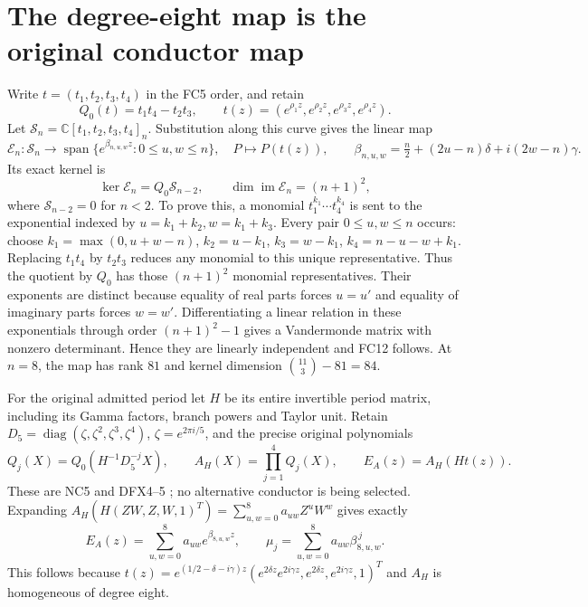 \documentclass[11pt]{article}
\newcommand{\C}{\mathbb C}
\newcommand{\diag}{\operatorname{diag}}
\begin{document}
\section{The degree-eight map is the original conductor map}
Write $t=(t_1,t_2,t_3,t_4)$ in the FC5 order, and retain
\[
 Q_0(t)=t_1t_4-t_2t_3,\qquad
 t(z)=(e^{\rho_1z},e^{\rho_2z},e^{\rho_3z},e^{\rho_4z}).
 \tag{FC10}
\]
Let $\mathcal S_n=\C[t_1,t_2,t_3,t_4]_n$. Substitution along this
curve gives the linear map
\[
 \mathcal E_n:\mathcal S_n\to
 \operatorname{span}\{e^{\beta_{n,u,w}z}:0\le u,w\le n\},
 \quad P\mapsto P(t(z)),\qquad
 \beta_{n,u,w}=\tfrac n2+(2u-n)\delta+i(2w-n)\gamma.
 \tag{FC11}
\]
Its exact kernel is
\[
 \ker\mathcal E_n=Q_0\mathcal S_{n-2},\qquad
 \dim\operatorname{im}\mathcal E_n=(n+1)^2,
 \tag{FC12}
\]
where $\mathcal S_{n-2}=0$ for $n<2$.
To prove this, a monomial $t_1^{k_1}\cdots t_4^{k_4}$ is sent to the
exponential indexed by $u=k_1+k_2,w=k_1+k_3$. Every pair $0\le u,w\le n$
occurs: choose
$k_1=\max(0,u+w-n)$, $k_2=u-k_1$, $k_3=w-k_1$,
$k_4=n-u-w+k_1$. Replacing $t_1t_4$ by $t_2t_3$ reduces any monomial to
this unique representative. Thus the quotient by $Q_0$ has those
$(n+1)^2$ monomial representatives. Their exponents are distinct because
equality of real parts forces $u=u'$ and equality of imaginary parts
forces $w=w'$. Differentiating a linear relation in these exponentials
through order $(n+1)^2-1$ gives a Vandermonde matrix with nonzero
determinant. Hence they are linearly independent and FC12 follows.
At $n=8$, the map has rank $81$ and kernel dimension
$\binom{11}{3}-81=84$.

For the original admitted period let $H$ be its entire invertible period
matrix, including its Gamma factors, branch powers and Taylor unit.
Retain $D_5=\diag(\zeta,\zeta^2,\zeta^3,\zeta^4)$,
$\zeta=e^{2\pi i/5}$, and the precise original polynomials
\[
 Q_j(X)=Q_0(H^{-1}D_5^{-j}X),\qquad
 A_H(X)=\prod_{j=1}^4Q_j(X),\qquad
 E_A(z)=A_H(Ht(z)).
 \tag{FC13}
\]
These are NC5 and DFX4--5 \cite{NC,Cumulative}; no alternative conductor
is being selected. Expanding
$A_H(H(ZW,Z,W,1)^T)=\sum_{u,w=0}^8 a_{uw}Z^uW^w$ gives exactly
\[
 E_A(z)=\sum_{u,w=0}^8a_{uw}e^{\beta_{8,u,w}z},\qquad
 \mu_j=\sum_{u,w=0}^8a_{uw}\beta_{8,u,w}^{\,j}.
 \tag{FC14}
\]
This follows because
$t(z)=e^{(1/2-\delta-i\gamma)z}
(e^{2\delta z}e^{2i\gamma z},e^{2\delta z},e^{2i\gamma z},1)^T$
and $A_H$ is homogeneous of degree eight.
\end{document}
